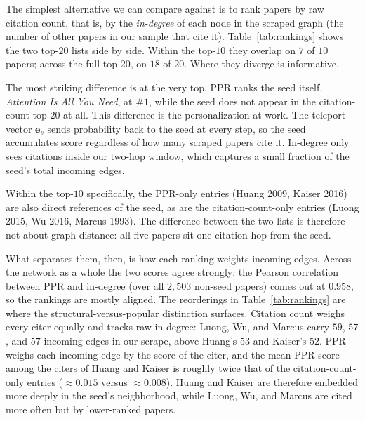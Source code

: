 \documentclass[conference]{IEEEtran}
\begin{document}
The simplest alternative we can compare against is to rank
papers by raw citation count, that is, by the \emph{in-degree}
of each node in the scraped graph (the number of other papers
in our sample that cite it). Table~\ref{tab:rankings} shows the two top-$20$ lists side by
side. Within the top-$10$ they overlap on $7$ of $10$ papers;
across the full top-$20$, on $18$ of $20$. Where they diverge is
informative.

The most striking difference is at the very top. PPR ranks the
seed itself, \emph{Attention Is All You Need}, at $\#1$, while
the seed does not appear in the citation-count top-$20$ at all.
This difference is the personalization at work. The teleport
vector $\mathbf{e}_s$ sends probability back to the seed at
every step, so the seed accumulates score regardless of how
many scraped papers cite it. In-degree only sees citations
inside our two-hop window, which captures a small fraction of
the seed's total incoming edges.

Within the top-$10$ specifically, the PPR-only entries (Huang
2009, Kaiser 2016) are also direct references of the seed, as
are the citation-count-only entries (Luong 2015, Wu 2016,
Marcus 1993). The difference between the two lists is therefore
not about graph distance: all five papers sit one citation hop
from the seed.

What separates them, then, is how each ranking weights incoming
edges. Across the network as a whole the two scores agree
strongly: the Pearson correlation between PPR and in-degree
(over all $2{,}503$ non-seed papers) comes out at $0.958$, so
the rankings are mostly aligned. The reorderings in
Table~\ref{tab:rankings} are where the structural-versus-popular
distinction surfaces. Citation count weighs every citer equally
and tracks raw in-degree: Luong, Wu, and Marcus carry $59$,
$57$, and $57$ incoming edges in our scrape, above Huang's $53$
and Kaiser's $52$. PPR weighs each incoming edge by the score
of the citer, and the mean PPR score among the citers of Huang
and Kaiser is roughly twice that of the citation-count-only
entries ($\approx 0.015$ versus $\approx 0.008$). Huang and Kaiser are
therefore embedded more deeply in the seed's neighborhood,
while Luong, Wu, and Marcus are cited more often but by
lower-ranked papers.
\end{document}
